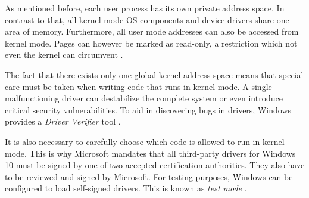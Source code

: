 As mentioned before, each user process has its own private address space. In contrast to that, all kernel mode OS components and device drivers share one area of memory. Furthermore, all user mode addresses can also be accessed from kernel mode. Pages can however be marked as read-only, a restriction which not even the kernel can circumvent \cite{Yosifovich2017}.

The fact that there exists only one global kernel address space means that special care must be taken when writing code that runs in kernel mode. A single malfunctioning driver can destabilize the complete system or even introduce critical security vulnerabilities. To aid in discovering bugs in drivers, Windows provides a \emph{Driver Verifier} tool \cite{Yosifovich2017}.

It is also necessary to carefully choose which code is allowed to run in kernel mode. This is why Microsoft mandates that all third-party drivers for Windows 10 must be signed by one of two accepted certification authorities. They also have to be reviewed and signed by Microsoft. For testing purposes, Windows can be configured to load self-signed drivers. This is known as \emph{test mode} \cite{Yosifovich2017}.

